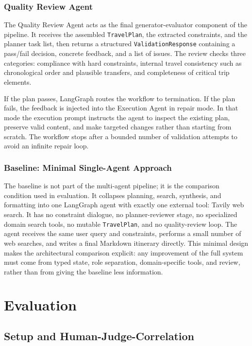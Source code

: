 \documentclass[a4paper,oneside,bibliography=totoc]{scrbook}
\begin{document}
\subsection{Quality Review Agent}

The Quality Review Agent acts as the final generator-evaluator component of the
pipeline. It receives the assembled \texttt{TravelPlan}, the extracted
constraints, and the planner task list, then returns a structured
\texttt{ValidationResponse} containing a pass/fail decision, concrete feedback,
and a list of issues. The review checks three categories: compliance with hard
constraints, internal travel consistency such as chronological order and
plausible transfers, and completeness of critical trip elements.

If the plan passes, LangGraph routes the workflow to termination. If the plan
fails, the feedback is injected into the Execution Agent in repair mode. In
that mode the execution prompt instructs the agent to inspect the existing
plan, preserve valid content, and make targeted changes rather than starting
from scratch. The workflow stops after a bounded number of validation attempts
to avoid an infinite repair loop.

\subsection{Baseline: Minimal Single-Agent Approach}

The baseline is not part of the multi-agent pipeline; it is the comparison
condition used in evaluation. It collapses planning, search, synthesis, and
formatting into one LangGraph agent with exactly one external tool: Tavily web
search. It has no constraint dialogue, no planner-reviewer stage, no specialized
domain search tools, no mutable \texttt{TravelPlan}, and no quality-review
loop. The agent receives the same user query and constraints, performs a small
number of web searches, and writes a final Markdown itinerary directly. This
minimal design makes the architectural comparison explicit: any improvement of
the full system must come from typed state, role separation, domain-specific
tools, and review, rather than from giving the baseline less information.

\chapter{Evaluation}
\section{Setup and Human-Judge-Correlation}
\end{document}

